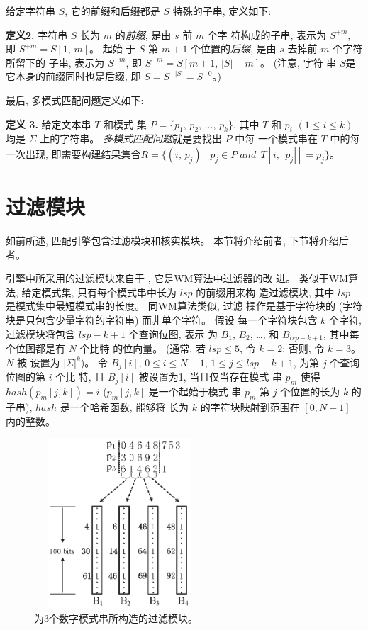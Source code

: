 给定字符串 $S$, 它的前缀和后缀都是 $S$ 特殊的子串, 定义如下:

\textbf{定义2.} 字符串 $S$ 长为 $m$ 的\emph{前缀}, 是由 $s$ 前 $m$ 个字
符构成的子串, 表示为 $S^{+m}$, 即 $S^{+m}=S[1,\,m]$。  起始
于 $S$ 第 $m+1$ 个位置的\emph{后缀}, 是由 $s$ 去掉前 $m$ 个字符所留下的
子串, 表示为 $S^{-m}$, 即 $S^{-m} = S[m+1,\,|S|-m]$。 (注意, 字符
串 $S$是它本身的前缀同时也是后缀, 即 $S=S^{+|S|}=S^{-0}$。)

最后, 多模式匹配问题定义如下:

\textbf{定义 3.} 给定文本串 $T$ 和模式
集 $P=\{p_1,\,p_2,\,\dots,\,p_k\}$, 其中 $T$ 和 $p_i$ $(1 \leq i \leq
k)$ 均是 $\Sigma$ 上的字符串。 \emph{多模式匹配问题}就是要找出 $P$ 中每
一个模式串在 $T$ 中的每一次出现,
即需要构建结果集合$R = \{(i,\, p_j)\;|\; p_j \in P\; and\,\;
T[i,\,|p_j|]=p_j\}$。


\section{过滤模块}
\label{sec:filter}

如前所述, 匹配引擎包含过滤模块和核实模块。 本节将介绍前者, 下节将介绍后
者。

引擎中所采用的过滤模块来自于 \cite{Lee2013}, 它是WM算法中过滤器的改
进。 类似于WM算法, 给定模式集, 只有每个模式串中长为 $lsp$ 的前缀用来构
造过滤模块, 其中 $lsp$ 是模式集中最短模式串的长度。 同WM算法类似, 过滤
操作是基于字符块的 (字符块是只包含少量字符的字符串) 而非单个字符。 假设
每一个字符块包含 $k$ 个字符, 过滤模块将包含 $lsp-k+1$ 个查询位图, 表示
为 $B_1$, $B_2$, \dots, 和 $B_{lsp-k+1}$, 其中每个位图都是有 $N$ 个比特
的位向量。  (通常, 若 $lsp \leq 5$, 令 $k = 2$; 否则, 令 $k=3$。$N$ 被
设置为 $|\Sigma|^k$)。 令 $B_j[i]$, $0 \leq i \leq N - 1$,
$1 \leq j \leq lsp-k+1$, 为第 $j$ 个查询位图的第 $i$ 个比
特, 且 $B_j[i]$ 被设置为1, 当且仅当存在模式
串 $p_m$ 使得 $hash(p_m[j,k]) = i$ ($p_m[j,k]$ 是一个起始于模式
串 $p_m$ 第 $j$ 个位置的长为 $k$ 的子串), $hash$ 是一个哈希函数, 能够将
长为 $k$ 的字符块映射到范围在 $[0, N-1]$ 内的整数。

\begin{figure}[H]
  \centering
  \includegraphics[height=2.5in, width=2.5in]{figures/2_MPM/filter.eps}
  \caption{为3个数字模式串所构造的过滤模块。}
  \label{fig:filter}
\end{figure}

